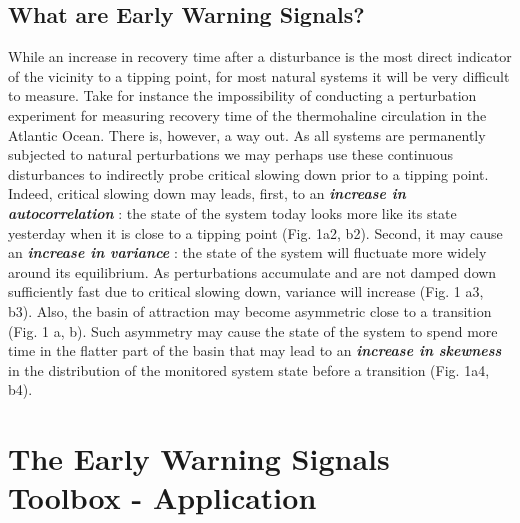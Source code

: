 \documentclass[12pt,a4paper,final]{article}
\begin{document}
\begin{doublespacing}
\subsection{What are Early Warning Signals?}
While an increase in recovery time after a disturbance is the most direct indicator of the vicinity to a tipping point, for most natural systems it will be very difficult to measure. Take for instance the impossibility of conducting a perturbation experiment for measuring recovery time of the thermohaline circulation in the Atlantic Ocean. There is, however, a way out. As all systems are permanently subjected to natural perturbations we may perhaps use these continuous disturbances to indirectly probe critical slowing down prior to a tipping point. Indeed, critical slowing down may leads, first, to an \textit{\textbf{increase in autocorrelation}} \cite{Ives1995,Held2004}: the state of the system today looks more like its state yesterday when it is close to a tipping point (Fig. 1a2, b2). %
Second, it may cause an \textit{\textbf{increase in variance}} \cite{Carpenter2006a}: the state of the system will fluctuate more widely around its equilibrium. As perturbations accumulate and are not damped down sufficiently fast due to critical slowing down, variance will increase (Fig. 1 a3, b3). Also, the basin of attraction may become asymmetric close to a transition \cite{Scheffer2009a} (Fig. 1 a, b). Such asymmetry may cause the state of the system to spend more time in the flatter part of the basin that may lead to an \textit{\textbf{increase in skewness}} \cite{Guttal2008} in the distribution of the monitored system state before a transition (Fig. 1a4, b4).

\section{The Early Warning Signals Toolbox - Application}

\end{doublespacing}
\end{document}
